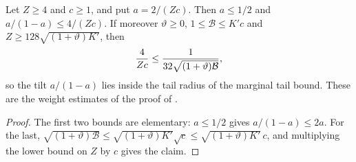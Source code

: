 \begin{lemma}
    \label{lem:harmonic_tail_weights}
    \leanok
    Let $Z\ge4$ and $c\ge1$, and put $a=2/(Zc)$. Then $a\le1/2$ and
    $a/(1-a)\le4/(Zc)$. If moreover $\vartheta\ge0$,
    $1\le\mathcal B\le K'c$ and $Z\ge128\sqrt{(1+\vartheta)K'}$, then
    \begin{align}
        \frac4{Zc}\le\frac1{32\sqrt{(1+\vartheta)\mathcal B}},
        \notag
    \end{align}
    so the tilt $a/(1-a)$ lies inside the tail radius of the marginal tail
    bound. These are the weight estimates of the proof of
    \cite[Lemma~3.2]{OpenAI2026AreaLaw}.
\end{lemma}

\begin{proof}\leanok
    The first two bounds are elementary: $a\le1/2$ gives
    $a/(1-a)\le2a$. For the last, $\sqrt{(1+\vartheta)\mathcal B}\le
        \sqrt{(1+\vartheta)K'}\sqrt c\le\sqrt{(1+\vartheta)K'}\,c$, and
    multiplying the lower bound on $Z$ by $c$ gives the claim.
\end{proof}
